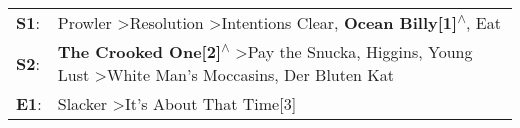 \begin{supertabular}{p{0.03\textwidth}p{0.92\textwidth}}
 \textbf{S1}:  &                                                                 Prowler\textsuperscript{} \textgreater \enspace Resolution\textsuperscript{} \textgreater \enspace Intentions Clear\textsuperscript{}, \enspace \textbf{Ocean Billy[1]\textsuperscript{$\wedge$}}, \enspace Eat\textsuperscript{}  \enspace  \\
 \textbf{S2}:  &  \textbf{The Crooked One[2]\textsuperscript{$\wedge$}} \textgreater \enspace Pay the Snucka\textsuperscript{}, \enspace Higgins\textsuperscript{}, \enspace Young Lust\textsuperscript{} \textgreater \enspace White Man's Moccasins\textsuperscript{}, \enspace Der Bluten Kat\textsuperscript{}  \enspace  \\
 \textbf{E1}:  &                                                                                                                                                                                                         Slacker\textsuperscript{} \textgreater \enspace It's About That Time[3]\textsuperscript{}  \enspace  \\
\end{supertabular}
